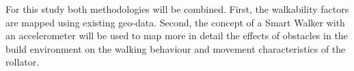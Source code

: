 For this study both methodologies will be combined. First, the walkability factors are mapped using existing geo-data. Second, the concept of a Smart Walker with an accelerometer will be used to map more in detail the effects of obstacles in the build environment on the walking behaviour and movement characteristics of the rollator. 